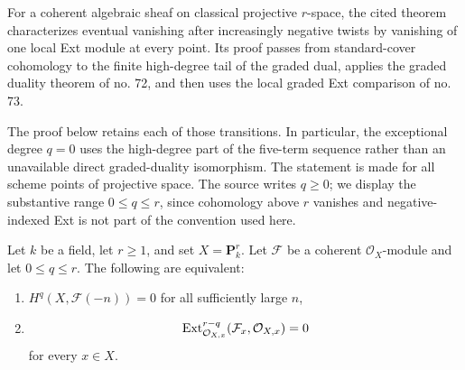 \begin{lemma}
\label{lemma-negative-twists-local-ext}
\begin{reference}
\cite[Chapter III, \S 5, no. 74, Theorem 1 and proof,
p. 268]{FAC}
\end{reference}
\begin{history}
For a coherent algebraic sheaf on classical projective $r$-space, the
cited theorem characterizes eventual vanishing after increasingly negative
twists by vanishing of one local Ext module at every point. Its proof
passes from standard-cover cohomology to the finite high-degree tail of the
graded dual, applies the graded duality theorem of no. 72, and then uses
the local graded Ext comparison of no. 73.

The proof below retains each of those transitions. In particular, the
exceptional degree $q=0$ uses the high-degree part of the five-term
sequence rather than an unavailable direct graded-duality isomorphism.
The statement is made for all scheme points of projective space. The
source writes $q\geq0$; we display the substantive range
$0\leq q\leq r$, since cohomology above $r$ vanishes and negative-indexed
Ext is not part of the convention used here.
\end{history}
Let $k$ be a field, let $r\geq1$, and set
$X=\mathbf{P}^r_k$. Let $\mathcal{F}$ be a coherent
$\mathcal{O}_X$-module and let $0\leq q\leq r$. The following are
equivalent:
\begin{enumerate}
\item $H^q(X,\mathcal{F}(-n))=0$ for all sufficiently large $n$,
\item
$$
\mathop{\mathrm{Ext}}\nolimits^{r-q}_{\mathcal{O}_{X,x}}
(\mathcal{F}_x,\mathcal{O}_{X,x})=0
$$
for every $x\in X$.
\end{enumerate}
\end{lemma}

